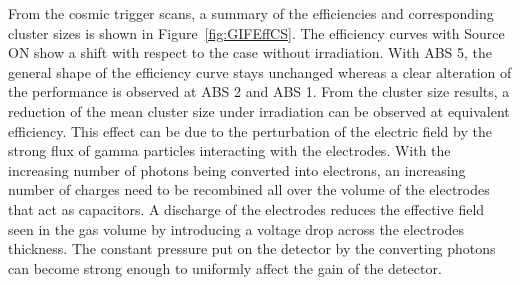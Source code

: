 	From the cosmic trigger scans, a summary of the efficiencies and corresponding cluster sizes is shown in Figure~\ref{fig:GIFEffCS}. The efficiency curves with Source ON show a shift with respect to the case without irradiation. With ABS 5, the general shape of the efficiency curve stays unchanged whereas a clear alteration of the performance is observed at ABS 2 and ABS 1. From the cluster size results, a reduction of the mean cluster size under irradiation can be observed at equivalent efficiency. This effect can be due to the perturbation of the electric field by the strong flux of gamma particles interacting with the electrodes. With the increasing number of photons being converted into electrons, an increasing number of charges need to be recombined all over the volume of the electrodes that act as capacitors. A discharge of the electrodes reduces the effective field seen in the gas volume by introducing a voltage drop across the electrodes thickness. The constant pressure put on the detector by the converting photons can become strong enough to uniformly affect the gain of the detector.
	
